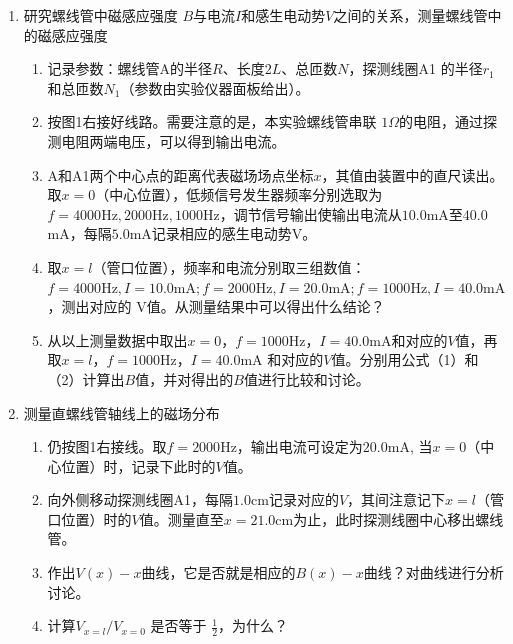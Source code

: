 \documentclass[12pt,a4paper]{article}
\begin{document}
	\begin{enumerate}
	\item 研究螺线管中磁感应强度 $B$与电流$I$和感生电动势$V$之间的关系，测量螺线管中的磁感应强度
	
	\begin{enumerate}
	
	\item 记录参数：螺线管A的半径$R$、长度$2L$、总匝数$N$，探测线圈A1 的半径$r_1$和总匝数$N_1$（参数由实验仪器面板给出）。\\
	\item  按图1右接好线路。需要注意的是，本实验螺线管串联 $1\Omega$的电阻，通过探测电阻两端电压，可以得到输出电流。 \\
	\item A和A1两个中心点的距离代表磁场场点坐标$x$，其值由装置中的直尺读出。取$x=0$（中心位置），低频信号发生器频率分别选取为$f=4000\mathrm{Hz},2000\mathrm{Hz},1000\mathrm{Hz}$，调节信号输出使输出电流从$10.0$mA至$40.0$mA，每隔$5.0$mA记录相应的感生电动势V。 \\
	\item 取$x=l$（管口位置），频率和电流分别取三组数值：$f=4000\mathrm{Hz},I=10.0\mathrm{mA};f=2000\mathrm{Hz},I=20.0\mathrm{mA};f=1000\mathrm{Hz},I=40.0\mathrm{mA}$，测出对应的 V值。从测量结果中可以得出什么结论？\\
	\item 从以上测量数据中取出$x=0$，$f=1000\mathrm{Hz}$，$I=40.0\mathrm{mA}$和对应的$V$值，再取$x=l$，$f=1000\mathrm{Hz}$，$I=40.0\mathrm{mA}$ 和对应的$V$值。分别用公式（1）和（2）计算出$B$值，并对得出的$B$值进行比较和讨论。\\
	
	\end{enumerate}

	\item {测量直螺线管轴线上的磁场分布}
	
	\begin{enumerate}
	\item 仍按图1右接线。取$f=2000\mathrm{Hz}$，输出电流可设定为$20.0\mathrm{mA}$, 当$x=0$（中心位置）时，记录下此时的$V$值。\\
	\item 向外侧移动探测线圈A1，每隔$1.0\mathrm{cm}$记录对应的$V$，其间注意记下$x=l$（管口位置）时的$V$值。测量直至$x=21.0\mathrm{cm}$为止，此时探测线圈中心移出螺线管。\\
	\item 作出$V(x)-x$曲线，它是否就是相应的$B(x)-x$曲线？对曲线进行分析讨论。\\
	\item 计算\(V_{x=l}/V_{x=0}\) 是否等于 \(\frac{1}{2}\)，为什么？

	\end{enumerate}

	\end{enumerate}
	
\end{document}
